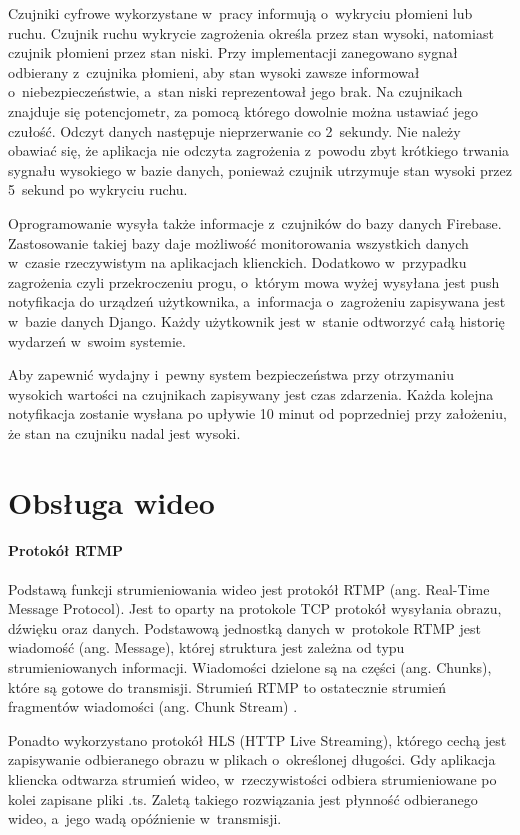 Czujniki cyfrowe wykorzystane w~pracy informują o~wykryciu płomieni lub ruchu. Czujnik ruchu wykrycie zagrożenia określa przez stan wysoki, natomiast czujnik płomieni przez stan niski. Przy implementacji zanegowano sygnał odbierany z~czujnika płomieni, aby stan wysoki zawsze informował o~niebezpieczeństwie, a~stan niski reprezentował jego brak. Na czujnikach znajduje się potencjometr, za pomocą którego dowolnie można ustawiać jego czułość. Odczyt danych następuje nieprzerwanie co 2~sekundy. Nie należy obawiać się, że aplikacja nie odczyta zagrożenia z~powodu zbyt krótkiego trwania sygnału wysokiego w bazie danych, ponieważ czujnik utrzymuje stan wysoki przez 5~sekund po wykryciu ruchu. 

Oprogramowanie wysyła także informacje z~czujników do bazy danych Firebase. Zastosowanie takiej bazy daje możliwość monitorowania wszystkich danych w~czasie rzeczywistym na aplikacjach klienckich. Dodatkowo w~przypadku zagrożenia czyli przekroczeniu progu, o~którym mowa wyżej wysyłana jest push notyfikacja do urządzeń użytkownika, a~informacja o~zagrożeniu zapisywana jest w~bazie danych Django. Każdy użytkownik jest w~stanie odtworzyć całą historię wydarzeń w~swoim systemie.

Aby zapewnić wydajny i~pewny system bezpieczeństwa przy otrzymaniu wysokich wartości na czujnikach zapisywany jest czas zdarzenia. Każda kolejna notyfikacja zostanie wysłana po upływie 10 minut od poprzedniej przy założeniu, że stan na czujniku nadal jest wysoki. 

\section{Obsługa wideo}

\paragraph{Protokół RTMP}
Podstawą funkcji strumieniowania wideo jest protokół RTMP (ang. Real-Time Message Protocol). Jest to oparty na protokole TCP protokół wysyłania obrazu, dźwięku oraz danych. \cite{MOBILERTMP}
Podstawową jednostką danych w~protokole RTMP jest wiadomość (ang. Message), której struktura jest zależna od typu strumieniowanych informacji. 
Wiadomości dzielone są na części (ang. Chunks), które są gotowe do transmisji. Strumień RTMP to ostatecznie strumień fragmentów wiadomości (ang. Chunk Stream) \cite{STREAMRTMP}.

Ponadto wykorzystano protokół HLS (HTTP Live Streaming), którego cechą jest zapisywanie odbieranego obrazu w plikach o~określonej długości. Gdy aplikacja kliencka odtwarza strumień wideo, w~rzeczywistości odbiera strumieniowane po kolei zapisane pliki .ts. Zaletą takiego rozwiązania jest płynność odbieranego wideo, a~jego wadą opóźnienie w~transmisji.

